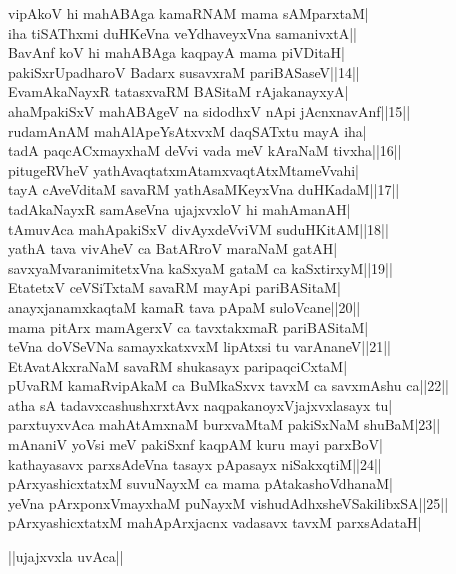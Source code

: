 \documentclass{article}
\begin{document}
vipAkoV hi mahABAga kamaRNAM mama sAMparxtaM|\\
iha tiSAThxmi duHKeVna veYdhaveyxVna samanivxtA||\\
BavAnf koV hi mahABAga kaqpayA mama piVDitaH|\\
pakiSxrUpadharoV Badarx susavxraM pariBASaseV||14||\\
EvamAkaNayxR tatasxvaRM BASitaM rAjakanayxyA|\\
ahaMpakiSxV mahABAgeV na sidodhxV nApi jAcnxnavAnf||15||\\
rudamAnAM mahAlApeYsAtxvxM daqSATxtu mayA iha|\\
tadA paqcACxmayxhaM deVvi vada meV kAraNaM tivxha||16||\\
pitugeRVheV yathAvaqtatxmAtamxvaqtAtxMtameVvahi|\\
tayA cAveVditaM savaRM yathAsaMKeyxVna duHKadaM||17||\\
tadAkaNayxR samAseVna ujajxvxloV hi mahAmanAH|\\
tAmuvAca mahApakiSxV divAyxdeVviVM suduHKitAM||18||\\
yathA tava vivAheV ca BatARroV maraNaM gatAH|\\
savxyaMvaranimitetxVna kaSxyaM gataM ca kaSxtirxyM||19||\\
EtatetxV ceVSiTxtaM savaRM mayApi pariBASitaM|\\
anayxjanamxkaqtaM kamaR tava pApaM suloVcane||20||\\
mama pitArx mamAgerxV ca tavxtakxmaR pariBASitaM|\\
teVna doVSeVNa samayxkatxvxM lipAtxsi tu varAnaneV||21||\\
EtAvatAkxraNaM savaRM shukasayx paripaqciCxtaM|\\
pUvaRM kamaRvipAkaM ca BuMkaSxvx tavxM ca savxmAshu ca||22||\\
atha sA tadavxcashushxrxtAvx naqpakanoyxVjajxvxlasayx tu|\\
parxtuyxvAca mahAtAmxnaM burxvaMtaM pakiSxNaM shuBaM|23||\\
mAnaniV yoVsi meV pakiSxnf kaqpAM kuru mayi parxBoV|\\
kathayasavx parxsAdeVna tasayx pApasayx niSakxqtiM||24||\\
pArxyashicxtatxM suvuNayxM ca mama pAtakashoVdhanaM|\\
yeVna pArxponxVmayxhaM puNayxM vishudAdhxsheVSakilibxSA||25||\\
pArxyashicxtatxM mahApArxjacnx vadasavx tavxM parxsAdataH|\\

\begin{center}
||ujajxvxla uvAca||
\end{center}
\end{document}
